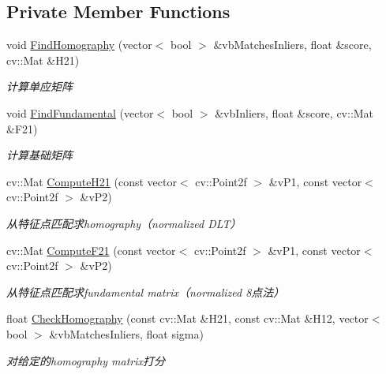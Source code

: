 \subsection*{Private Member Functions}
\begin{DoxyCompactItemize}
\item 
void \mbox{\hyperlink{class_o_r_b___s_l_a_m2_1_1_initializer_a5b0465b2affed7453d30dd85672e9093}{Find\+Homography}} (vector$<$ bool $>$ \&vb\+Matches\+Inliers, float \&score, cv\+::\+Mat \&H21)
\begin{DoxyCompactList}\small\item\em 计算单应矩阵 \end{DoxyCompactList}\item 
void \mbox{\hyperlink{class_o_r_b___s_l_a_m2_1_1_initializer_a387c406706472859415c0e7a3594ea04}{Find\+Fundamental}} (vector$<$ bool $>$ \&vb\+Inliers, float \&score, cv\+::\+Mat \&F21)
\begin{DoxyCompactList}\small\item\em 计算基础矩阵 \end{DoxyCompactList}\item 
cv\+::\+Mat \mbox{\hyperlink{class_o_r_b___s_l_a_m2_1_1_initializer_a16d5aa375ed03336cc0dc981861b15da}{Compute\+H21}} (const vector$<$ cv\+::\+Point2f $>$ \&v\+P1, const vector$<$ cv\+::\+Point2f $>$ \&v\+P2)
\begin{DoxyCompactList}\small\item\em 从特征点匹配求homography（normalized D\+L\+T） \end{DoxyCompactList}\item 
cv\+::\+Mat \mbox{\hyperlink{class_o_r_b___s_l_a_m2_1_1_initializer_aaca077af095ae1de08ebb473af670d1d}{Compute\+F21}} (const vector$<$ cv\+::\+Point2f $>$ \&v\+P1, const vector$<$ cv\+::\+Point2f $>$ \&v\+P2)
\begin{DoxyCompactList}\small\item\em 从特征点匹配求fundamental matrix（normalized 8点法） \end{DoxyCompactList}\item 
float \mbox{\hyperlink{class_o_r_b___s_l_a_m2_1_1_initializer_ac2ac8374ca2a993b8cddc88703ffbe9a}{Check\+Homography}} (const cv\+::\+Mat \&H21, const cv\+::\+Mat \&H12, vector$<$ bool $>$ \&vb\+Matches\+Inliers, float sigma)
\begin{DoxyCompactList}\small\item\em 对给定的homography matrix打分 \end{DoxyCompactList}\item 

\end{DoxyCompactItemize}
